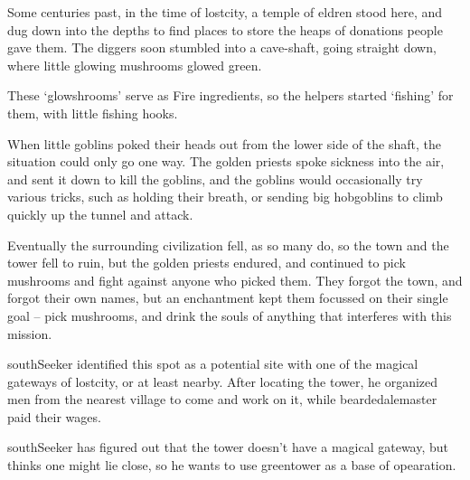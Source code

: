 

\begin{exampletext}
  Some centuries past, in the time of \gls{lostcity}, a temple of \gls{eldren} stood here, and dug down into the depths to find places to store the heaps of donations people gave them.
  The diggers soon stumbled into a cave-shaft, going straight down, where little glowing mushrooms glowed green.%

  These `glowshrooms' serve as Fire \glspl{ingredient}, so the \glspl{helper} started `fishing' for them, with little fishing hooks.

  When little goblins poked their heads out from the lower side of the shaft, the situation could only go one way.
  The golden priests spoke sickness into the air, and sent it down to kill the goblins, and the goblins would occasionally try various tricks, such as holding their breath, or sending big hobgoblins to climb quickly up the tunnel and attack.

  Eventually the surrounding civilization fell, as so many do, so the town and the tower fell to ruin, but the golden priests endured, and continued to pick mushrooms and fight against anyone who picked them.
  They forgot the town, and forgot their own names, but an enchantment kept them focussed on their single goal -- pick mushrooms, and drink the souls of anything that interferes with this mission.
\end{exampletext}

\begin{exampletext}
  \Gls{southSeeker} identified this spot as a potential site with one of the magical gateways of \gls{lostcity}, or at least nearby.
  After locating the tower, he organized men from the nearest \gls{village} to come and work on it, while \gls{beardedalemaster} paid their wages.

  \Gls{southSeeker} has figured out that the tower doesn't have a magical gateway, but thinks one might lie close, so he wants to use \gls{greentower} as a base of opearation.
\end{exampletext}


